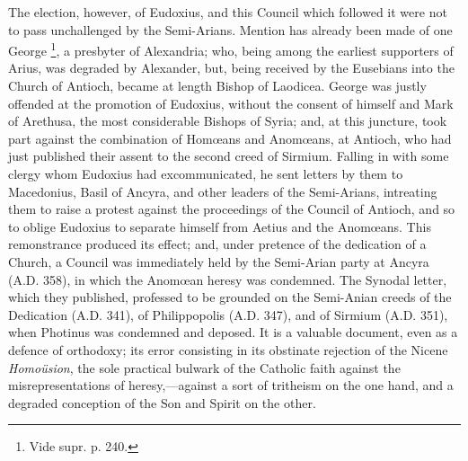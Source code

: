 The election, however, of Eudoxius, and this Council which followed
it were not to pass unchallenged by the Semi-Arians. Mention has
already been made of one George \footnote{Vide supr. p. 240.}, a presbyter of Alexandria; who, being among the earliest
supporters of Arius, was degraded by Alexander, but, being received by
the Eusebians into the Church of Antioch, became at length Bishop of
Laodicea. George was justly offended at the promotion of Eudoxius,
without the consent of himself and Mark of Arethusa, the most
considerable Bishops of Syria; and, at this juncture, took part
against the combination of Homœans and Anomœans, at Antioch, who had
just published their assent to the second creed of Sirmium. Falling in
with some clergy whom Eudoxius had excommunicated, he sent letters by
them to Macedonius, Basil of Ancyra, and other leaders of the
Semi-Arians, intreating them to raise a protest against the
proceedings of the Council of Antioch, and so to oblige Eudoxius to
separate himself from Aetius and the Anomœans. This remonstrance
produced its effect; and, under pretence of the dedication of a
Church, a Council was immediately held by the Semi-Arian party at
Ancyra (A.D. 358), in which the Anomœan heresy
was condemned. The Synodal letter, which they published, professed to
be grounded on the Semi-Anian creeds of the Dedication (A.D.
341), of Philippopolis (A.D. 347), and of
Sirmium (A.D. 351), when Photinus was
condemned and deposed. It is a valuable document, even as a defence of
orthodoxy; its error consisting in its obstinate rejection of the
Nicene \emph{Homoüsion}, the sole practical bulwark of the Catholic
faith against the misrepresentations of heresy,—against a sort of
tritheism on the one hand, and a degraded conception of the Son and
Spirit on the other.

